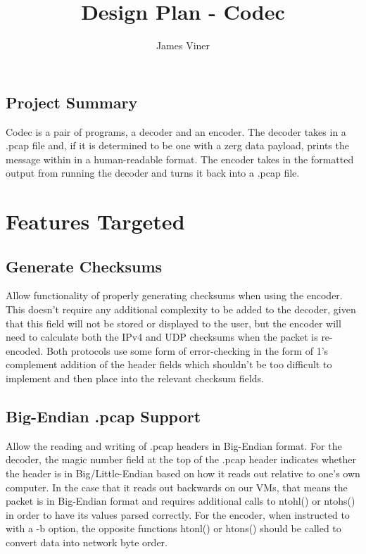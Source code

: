 \documentclass[11pt]{report}
\begin{document}
\title{Design Plan - Codec}
\author{James Viner}
\date{} %
\maketitle

\doublespacing

\vspace*{\fill}
\begin{center}
\section*{\textbf{Project Summary}}
Codec is a pair of programs, a decoder and an encoder. The decoder takes in a .pcap file and, if it is determined to be one with a zerg data payload, prints the message within in a human-readable format. The encoder takes in the formatted output from running the decoder and turns it back into a .pcap file.
\end{center}
\vfill
\pagebreak
\section*{Features Targeted}
\subsection*{Generate Checksums}
Allow functionality of properly generating checksums when using the encoder. This doesn't require any additional complexity to be added to the decoder, given that this field will not be stored or displayed to the user, but the encoder will need to calculate both the IPv4 and UDP checksums when the packet is re-encoded. Both protocols use some form of error-checking in the form of 1's complement addition of the header fields which shouldn't be too difficult to implement and then place into the relevant checksum fields.
\subsection*{Big-Endian .pcap Support}
Allow the reading and writing of .pcap headers in Big-Endian format. For the decoder, the magic number field at the top of the .pcap header indicates whether the header is in Big/Little-Endian based on how it reads out relative to one's own computer. In the case that it reads out backwards on our VMs, that means the packet is in Big-Endian format and requires additional calls to ntohl() or ntohs() in order to have its values parsed correctly. For the encoder, when instructed to with a -b option, the opposite functions htonl() or htons() should be called to convert data into network byte order.
\pagebreak
\end{document}
